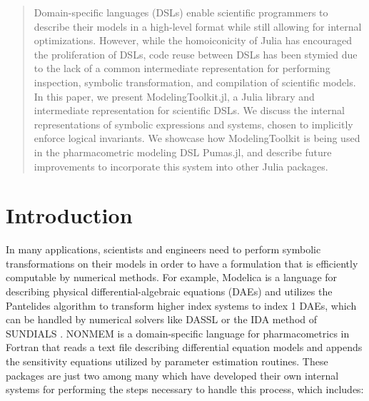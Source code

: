 \documentclass{juliacon}
\begin{document}


\maketitle

\begin{abstract}

Domain-specific languages (DSLs) enable scientific programmers to describe their models in a high-level format while still allowing for internal optimizations. However, while the homoiconicity of Julia has encouraged the proliferation of DSLs, code reuse between DSLs has been stymied due to the lack of a common intermediate representation for performing inspection, symbolic transformation, and compilation of scientific models. In this paper, we present ModelingToolkit.jl, a Julia library and intermediate representation for scientific DSLs. We discuss the internal representations of symbolic expressions and systems, chosen to implicitly enforce logical invariants. We showcase how ModelingToolkit is being used in the pharmacometric modeling DSL Pumas.jl, and describe future improvements to incorporate this system into other Julia packages.

\headingtable

\end{abstract}

\section{Introduction}

In many applications, scientists and engineers need to perform symbolic transformations on their models in order to have a formulation that is efficiently computable by numerical methods. For example, Modelica \cite{mattsson_modelica_1997} is a language for describing physical differential-algebraic equations (DAEs) and utilizes the Pantelides algorithm \cite{doi:10.1137/0909014} to transform higher index systems to index 1 DAEs, which can be handled by numerical solvers like DASSL \cite{petzold_description_nodate} or the IDA method of SUNDIALS \cite{alan_c._hindmarsh_sundials:_2005}. NONMEM \cite{sheiner1977estimation} is a domain-specific language for pharmacometrics in Fortran that reads a text file describing differential equation models and appends the sensitivity equations utilized by parameter estimation routines. These packages are just two among many which have developed their own internal systems for performing the steps necessary to handle this process, which includes:
\end{document}

